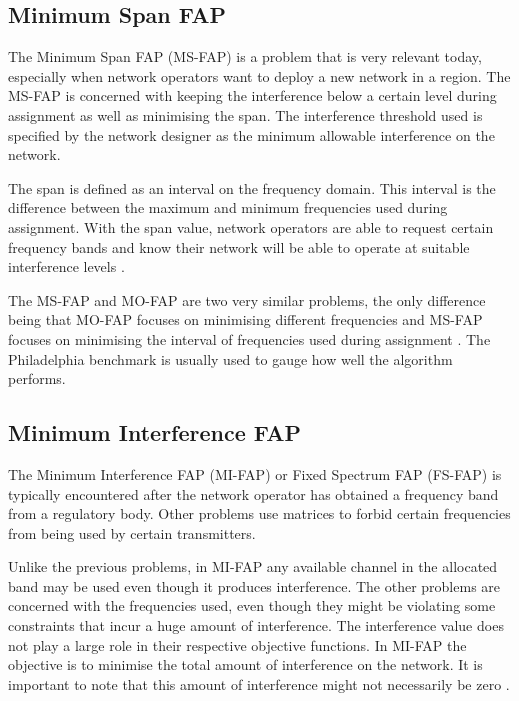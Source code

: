 \subsection{Minimum Span FAP}
The Minimum Span FAP (MS-FAP) is a problem that is very relevant today, especially when network operators want to deploy a new network in a region\cite{Karen2004}. The MS-FAP is concerned with keeping the interference below a certain level during assignment as well as minimising the span. The interference threshold used is specified by the network designer as the minimum allowable interference on the network\cite{Karen2004,MontemanniThesis,MSFAP}.

The span is defined as an interval on the frequency domain. This interval is the difference between the maximum and minimum frequencies used during assignment\cite{Karen2004,MontemanniThesis,MSFAP}. With the span value, network operators are able to request certain frequency bands and know their network will be able to operate at suitable interference levels \cite{Karen2004,MontemanniThesis,MSFAP}.

The MS-FAP and MO-FAP are two very similar problems, the only difference being that MO-FAP focuses on minimising different frequencies and MS-FAP focuses on minimising the interval of frequencies used during assignment \cite{Karen2004}. The Philadelphia benchmark is usually used to gauge how well the algorithm performs.
\subsection{Minimum Interference FAP}
The Minimum Interference FAP (MI-FAP) or Fixed Spectrum FAP (FS-FAP) is typically encountered after the network operator has obtained a frequency band from a regulatory body. Other problems use matrices to forbid certain frequencies from being used by certain transmitters\cite{Karen2004,Eisenblatter,MontemanniThesis,MultipleBinaryFAP}. 

Unlike the previous problems, in MI-FAP any available channel in the allocated band may be used even though it produces interference. The other problems are concerned with the frequencies used, even though they might be violating some constraints that incur a huge amount of interference\cite{Karen2004,Eisenblatter,MontemanniThesis,MultipleBinaryFAP}. The interference value does not play a large role in their respective objective functions\cite{Karen2004,Eisenblatter,MontemanniThesis,MultipleBinaryFAP}. In MI-FAP the objective is to minimise the total amount of interference on the network. It is important to note that this amount of interference might not necessarily be zero \cite{Karen2004,Eisenblatter,MontemanniThesis,MultipleBinaryFAP}.

